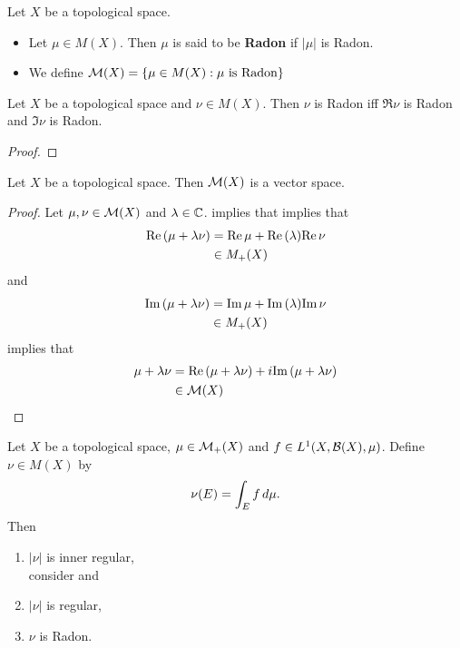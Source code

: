 \documentclass{book}
\begin{document}
	\begin{defn} 
		Let $X$ be a topological space.
		\begin{itemize}
			\item Let $\mu \in M(X)$. Then $\mu$ is said to be \textbf{Radon} if $|\mu|$ is Radon.
			\item We define $\mathcal{M}(X) = \{\mu \in M(X): \mu \text{ is Radon}\}$
		\end{itemize}
	\end{defn}
	
	\begin{ex} 
		Let $X$ be a topological space and $\nu \in M(X)$. Then $\nu$ is Radon iff $\Re \nu $ is Radon and $\Im \nu$ is Radon.  
	\end{ex}

	\begin{proof}
	\end{proof}

	\begin{ex} 
		Let $X$ be a topological space. Then $\mathcal{M}(X)$ is a vector space. 
	\end{ex}
	
	\begin{proof}
		Let $\mu, \nu \in \mathcal{M}(X)$ and $\lambda \in \mathbb{C}$.  implies that   implies that
		\begin{align*}
			\text{Re} \, (\mu + \lambda \nu) 
			& = \text{Re} \, \mu + \text{Re} \,(\lambda) \text{Re} \, \nu \\
			& \in M_+(X)
		\end{align*}
		and 
		\begin{align*}
			\text{Im} \, (\mu + \lambda \nu) 
			& = \text{Im} \, \mu + \text{Im} \,(\lambda) \text{Im} \, \nu \\
			& \in M_+(X)
		\end{align*}  
		 implies that 
		\begin{align*}
			\mu + \lambda \nu 
			& = \text{Re} \, (\mu + \lambda \nu)  + i \text{Im} \, (\mu + \lambda \nu) \\
			& \in \mathcal{M}(X)
		\end{align*}
	\end{proof}

	\begin{ex}  
		Let $X$ be a topological space, $\mu \in \mathcal{M}_+(X)$ and $f \in L^1(X, \mathcal{B}(X), \mu)$. Define $\nu \in M(X)$ by 
		$$\nu(E) = \int_E f \, d \mu.$$
		Then 
		\begin{enumerate}
			\item $|\nu|$ is inner regular, \\
			 consider  and  
			\item $|\nu|$ is regular,
			\item $\nu$ is Radon.
		\end{enumerate}
	\end{ex}
	
\end{document}
